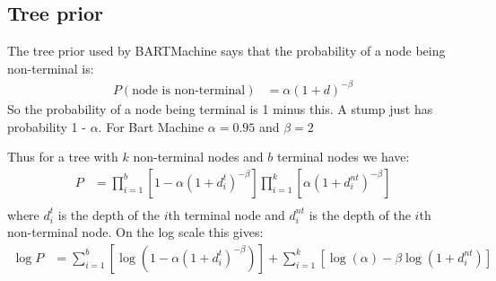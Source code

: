 \documentclass{article}
\begin{document}
\subsection*{Tree prior}

The tree prior used by BARTMachine says that the probability of a node being non-terminal is:
\begin{align*}
P(\mbox{node is non-terminal}) &= \alpha (1 + d)^{-\beta}
\end{align*}
So the probability of a node being terminal is 1 minus this. A stump just has probability 1 - $\alpha$. For Bart Machine $\alpha = 0.95$ and $\beta = 2$

Thus for a tree with $k$ non-terminal nodes and $b$ terminal nodes we have:
\begin{align*}
P &= \prod_{i=1}^b \left[ 1 - \alpha (1 + d^t_i)^{-\beta} \right] \prod_{i=1}^k \left[ \alpha (1 + d^{nt}_i)^{-\beta} \right] \\
\end{align*}
where $d^t_i$ is the depth of the $i$th terminal node and $d^{nt}_i$ is the depth of the $i$th non-terminal node.
On the log scale this gives:
\begin{align}
\log P &= \sum_{i=1}^b \left[ \log \left(1 - \alpha(1 + d^t_i)^{-\beta} \right) \right] + \sum_{i=1}^k \left[ \log(\alpha) - \beta \log(1 + d^{nt}_i) \right]
\end{align}
\end{document}
